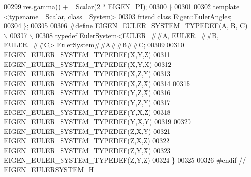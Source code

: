 \begin{DoxyCode}
00299         res.\hyperlink{class_eigen_1_1_euler_angles_aa75a5f16105d96eedf81bf9f8e789e21}{gamma}() += Scalar(2 * EIGEN\_PI);
00300     \}
00301     
00302     \textcolor{keyword}{template} <\textcolor{keyword}{typename} \_Scalar, \textcolor{keyword}{class} \_System>
00303     \textcolor{keyword}{friend} \textcolor{keyword}{class }\hyperlink{class_eigen_1_1_euler_angles}{Eigen::EulerAngles};
00304   \};
00305 
00306 \textcolor{preprocessor}{#define EIGEN\_EULER\_SYSTEM\_TYPEDEF(A, B, C) \(\backslash\)}
00307 \textcolor{preprocessor}{ \(\backslash\)}
00308 \textcolor{preprocessor}{  typedef EulerSystem<EULER\_##A, EULER\_##B, EULER\_##C> EulerSystem##A##B##C;}
00309   
00310   EIGEN\_EULER\_SYSTEM\_TYPEDEF(X,Y,Z)
00311   EIGEN\_EULER\_SYSTEM\_TYPEDEF(X,Y,X)
00312   EIGEN\_EULER\_SYSTEM\_TYPEDEF(X,Z,Y)
00313   EIGEN\_EULER\_SYSTEM\_TYPEDEF(X,Z,X)
00314   
00315   EIGEN\_EULER\_SYSTEM\_TYPEDEF(Y,Z,X)
00316   EIGEN\_EULER\_SYSTEM\_TYPEDEF(Y,Z,Y)
00317   EIGEN\_EULER\_SYSTEM\_TYPEDEF(Y,X,Z)
00318   EIGEN\_EULER\_SYSTEM\_TYPEDEF(Y,X,Y)
00319   
00320   EIGEN\_EULER\_SYSTEM\_TYPEDEF(Z,X,Y)
00321   EIGEN\_EULER\_SYSTEM\_TYPEDEF(Z,X,Z)
00322   EIGEN\_EULER\_SYSTEM\_TYPEDEF(Z,Y,X)
00323   EIGEN\_EULER\_SYSTEM\_TYPEDEF(Z,Y,Z)
00324 \}
00325 
00326 \textcolor{preprocessor}{#endif // EIGEN\_EULERSYSTEM\_H}
\end{DoxyCode}
